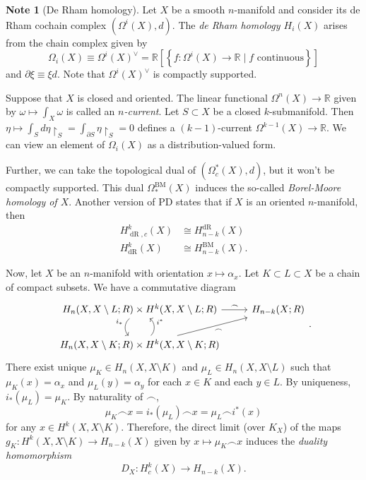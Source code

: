 \documentclass[10pt,letterpaper,cm]{nupset}
\theoremstyle{definition}
\newtheorem{note}[definition]{Note}
\theoremstyle{theorem}
\theoremstyle{remark}
\newcommand{\R}{\mathbb{R}}
\newcommand{\1}{\mathbb{1}}
\newcommand{\0}{\vec 0}
\DeclareMathOperator{\dr}{dR}
\DeclareMathOperator{\BM}{BM}
\begin{document}
\begin{note}[De Rham homology]
Let $X$ be a smooth $n$-manifold and consider its de Rham cochain complex $\left(\Omega^i(X), d\right)$. The \textit{de Rham homology $H_i(X)$} arises from the chain complex given by $$\Omega_i(X) \equiv \Omega^i(X)^{\vee} = \R\left[\left\{f : \Omega^i(X) \to \R \mid f \text{ continuous}\right\}\right]$$ and $\partial{\xi} \equiv \xi{d}$. Note that $ \Omega^i(X)^{\vee}$ is compactly supported. 

Suppose that $X$ is closed and oriented. The linear functional $\Omega^n(X) \to \R$ given by $\omega  \mapsto \int_X \omega$ is called an \textit{$n$-current}. Let $S \subset X$ be a closed $k$-submanifold. Then $ \eta \mapsto \int_S d{\eta \restriction_S} = \int_{\partial{S}} \eta \restriction_S =0$ defines a $(k-1)$-current $\Omega^{k-1}(X) \to \R$. We can view an element of $\Omega_i(X)$ as a distribution-valued form.

Further, we can take the topological dual of $\left(\Omega_c^{\ast}(X), d\right)$, but it won't be compactly supported. This dual $\Omega_{\ast}^{\BM}(X)$ induces the so-called \textit{Borel-Moore homology of $X$}. Another version of PD states that if $X$ is an oriented $n$-manifold, then
\begin{align*}
H^k_{\dr, c}(X) & \cong H^{\dr}_{n-k}(X)
\\  H^k_{\dr}(X) & \cong  H^{\BM}_{n-k}(X) 
. \end{align*}
\end{note}

\medskip

Now, let $X$ be an $n$-manifold with orientation $x \mapsto \alpha_x$. Let $K \subset  L \subset X$ be a chain of compact subsets.  We have a commutative diagram
\[
\begin{tikzcd}
{H_n(X, X \setminus L; R)\times H^k(X, X \setminus L; R)} \arrow[r, "\frown"] \arrow[d, "i_{\ast}"', bend right=49]     & H_{n-k}(X; R) \\
{H_n(X, X \setminus K; R) \times H^k(X, X \setminus K ; R)} \arrow[ru, "\frown"'] \arrow[u, "i^{\ast}"', bend right=49] &              
\end{tikzcd}
.\] There exist unique $\mu_K \in H_n(X, X \setminus K)$ and $\mu_L \in H_n(X, X \setminus L)$ such that $\mu_K(x) = \alpha_x$ and $\mu_L(y) = \alpha_y$ for each $x\in K$ and each $y\in L$. By uniqueness, $i_{\ast}(\mu_L) = \mu_K$. By naturality of $\frown$, $$\mu_K \frown x = i_{\ast}(\mu_L) \frown x = \mu_L \frown i^{\ast}(x)$$ for any $x\in H^k(X, X \setminus K)$. Therefore, the direct limit (over $K_X$) of the maps $g_K : H^k(X, X \setminus K) \to H_{n-k}(X)$ given by $x \mapsto \mu_K \frown x$ induces the \textit{duality homomorphism} $$ D_X : H_c^k(X) \to H_{n-k}(X)  .$$
\end{document}
